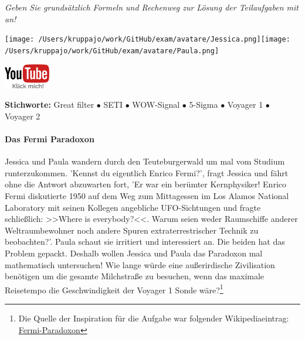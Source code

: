 \documentclass[a4paper, 9pt]{scrartcl}\usepackage[]{graphicx}\usepackage[]{xcolor}
\begin{document}
\textit{Geben Sie grundsätzlich Formeln und Rechenweg zur Lösung der Teilaufgaben mit an!} \\[1Ex]
 

 
\ifcollection
\begin{flushright}
\tiny\vspace{-3Ex}
\textbf{\examinhaltstart}
\exammodulemathstat
\vspace{-4Ex}
\end{flushright}
\begin{minipage}[t]{0.5\textwidth}
\texttt{[image: /Users/kruppajo/work/GitHub/exam/avatare/Jessica.png]}\hspace{-4mm}\texttt{[image: /Users/kruppajo/work/GitHub/exam/avatare/Paula.png]}
\end{minipage}
\begin{minipage}[t]{0.5\textwidth}
\hfill
\href{https://youtu.be/iCQogS6KhPM}{\includegraphics[width = 2cm]{img/youtube}}
\end{minipage}
\fi

{\tiny\textbf{Stichworte:} Great filter $\bullet$ SETI $\bullet$ WOW-Signal $\bullet$ 5-Sigma $\bullet$ Voyager 1 $\bullet$ Voyager 2}




\ifcollection
\paragraph{Das Fermi Paradoxon}
\fi



Jessica und Paula wandern durch den Teuteburgerwald um mal vom Studium runterzukommen. 'Kennst du eigentlich Enrico Fermi?', fragt Jessica und fährt ohne die Antwort abzuwarten fort, 'Er war ein berümter Kernphysiker! Enrico Fermi diskutierte 1950 auf dem Weg zum Mittagessen im Los Alamos National Laboratory mit seinen Kollegen angebliche UFO-Sichtungen und fragte schließlich: >>Where is everybody?<<. Warum seien weder Raumschiffe anderer Weltraumbewohner noch andere Spuren extraterrestrischer Technik zu beobachten?'. Paula schaut sie irritiert und interessiert an. Die beiden hat das Problem gepackt. Deshalb wollen Jessica und Paula das Paradoxon mal mathematisch untersuchen! Wie lange würde eine außerirdische Zivilisation benötigen um die gesamte Milchstraße zu besuchen, wenn das maximale Reisetempo die Geschwindigkeit der Voyager 1 Sonde wäre?\footnote{Die Quelle der Inspiration für die Aufgabe war folgender Wikipediaeintrag: \href{https://de.wikipedia.org/wiki/Fermi-Paradoxon}{Fermi-Paradoxon}}\\[-1ex]
\end{document}
